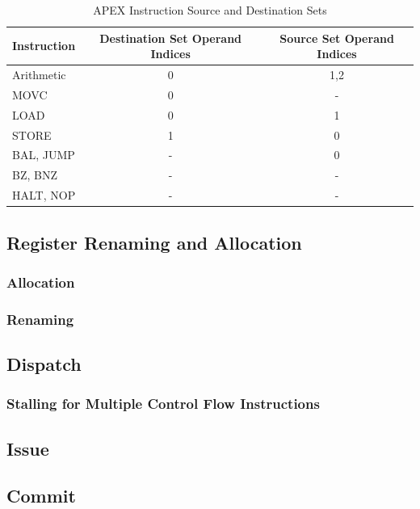 \documentclass[12pt]{article}
\begin{document}

\begin{table}
  \centering
  \caption{APEX Instruction Source and Destination Sets}
  \label{tab:instsets}
  \begin{tabular}{l|c|c}
    Instruction & Destination Set Operand Indices & Source Set Operand Indices\\
    \hline
    Arithmetic					 	& 0 & 1,2\\
    MOVC 							& 0 & - \\
    LOAD							& 0 & 1 \\
    STORE							& 1 & 0 \\
    BAL, JUMP						& - & 0 \\
    BZ, BNZ 						& - & - \\
    HALT, NOP						& - & - \\
  \end{tabular}
\end{table}

\subsection{Register Renaming and Allocation}
\subsubsection{Allocation}
\subsubsection{Renaming}

\subsection{Dispatch}
\subsubsection{Stalling for Multiple Control Flow Instructions}

\subsection{Issue}

\subsection{Commit}
\end{document}
